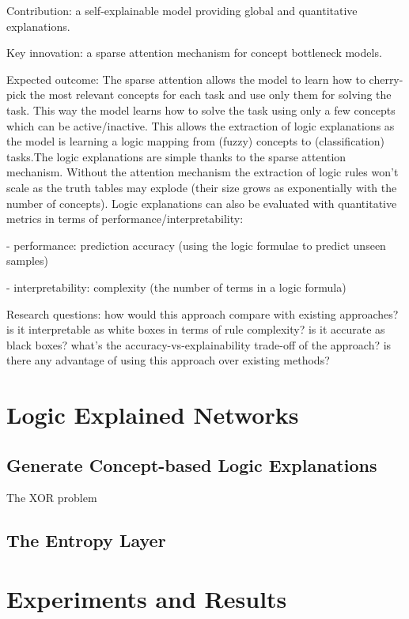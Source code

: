 \documentclass[withindex,glossary]{cam-thesis}
\begin{document}
Contribution: a self-explainable model providing global and quantitative explanations.

Key innovation: a sparse attention mechanism for concept bottleneck models.

Expected outcome: The sparse attention allows the model to learn how to cherry-pick the most relevant concepts for each task and use only them for solving the task. This way the model learns how to solve the task using only a few concepts which can be active/inactive. This allows the extraction of logic explanations as the model is learning a logic mapping from (fuzzy) concepts to (classification) tasks.The logic explanations are simple thanks to the sparse attention mechanism. Without the attention mechanism the extraction of logic rules won't scale as the truth tables may explode (their size grows as exponentially with the number of concepts). Logic explanations can also be evaluated with quantitative metrics in terms of performance/interpretability: 

- performance: prediction accuracy (using the logic formulae to predict unseen samples)

- interpretability: complexity (the number of terms in a logic formula)

Research questions: how would this approach compare with existing approaches? is it interpretable as white boxes in terms of rule complexity? is it accurate as black boxes? what's the accuracy-vs-explainability trade-off of the approach? is there any advantage of using this approach over existing methods?


\section{Logic Explained Networks}

\subsection{Generate Concept-based Logic Explanations}
The XOR problem

\subsection{The Entropy Layer}

\section{Experiments and Results}
\end{document}
